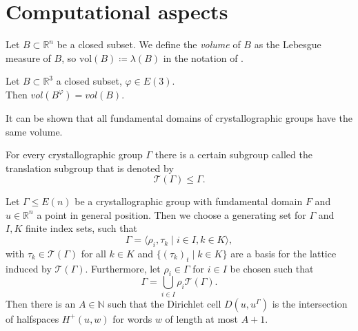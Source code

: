 \documentclass{beamer}
\theoremstyle{plain}
\newcommand\R{\mathbb R}
\newcommand\N{\mathbb N}
\renewcommand{\phi}{\varphi}
\newcommand{\vol}{\mathrm{vol}}
\newcommand{\T}{\mathcal{T}}
\begin{document}
\section{Computational aspects}
\begin{frame}
    \begin{definition}
        Let $B\subset \R^n$ be a closed subset. 
        We define the \emph{volume} of $B$ as the Lebesgue measure of $B$, so $\vol(B) \coloneqq \lambda(B)$ in the notation of \cite{forster2012analysis3}. 
    \end{definition} \pause

    \begin{theorem}
        Let $B \subset \R^3$ a closed subset, $\phi \in E(3)$. \\ \pause
        Then $vol(B^\phi) = vol(B)$.
    \end{theorem}
    \pause
    It can be shown that all fundamental domains of crystallographic groups have the same volume.
\end{frame}

\begin{frame}
    \begin{remark}
        For every crystallographic group $\Gamma$ there is a certain subgroup called the translation subgroup that is denoted by 
        $$
            \T(\Gamma) \leq \Gamma.
        $$
    \end{remark}
\end{frame}

\begin{frame}
    \begin{theorem}
        Let $\Gamma \leq E(n)$ be a crystallographic group with fundamental domain $F$ and $u \in \R^n$ a point in general position. Then we choose a generating set for $\Gamma$ and $I, K$ finite index sets, such that
        $$
            \Gamma = \langle \rho_i, \tau_k \mid i \in I, k \in K \rangle,
        $$\pause
        with $\tau_k \in \T(\Gamma)$ for all $k \in K$ and $\{ (\tau_k)_t \mid k \in K \}$ are a basis for the lattice induced by $\T(\Gamma)$. Furthermore, let $\rho_i \in \Gamma$  for $i \in I$ be chosen such that 
        $$
            \Gamma = \bigcup_{i \in I} \rho_i \T(\Gamma).
        $$\pause
        Then there is an $A \in \N$ such that the Dirichlet cell $D(u, u^\Gamma)$ is the intersection of halfspaces $H^+(u,w)$ for words $w$ of length at most $A+1$.
    \end{theorem}
\end{frame}
\end{document}
